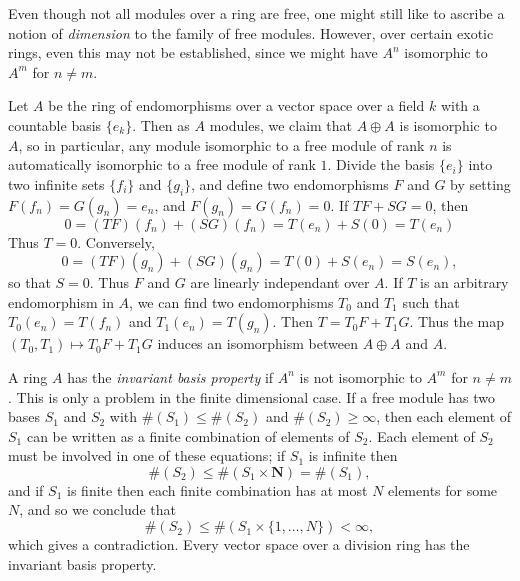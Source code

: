 Even though not all modules over a ring are free, one might still like to ascribe a notion of \emph{dimension} to the family of free modules. However, over certain exotic rings, even this may not be established, since we might have $A^n$ isomorphic to $A^m$ for $n \neq m$.

\begin{example}
    Let $A$ be the ring of endomorphisms over a vector space over a field $k$ with a countable basis $\{ e_k \}$. Then as $A$ modules, we claim that $A \oplus A$ is isomorphic to $A$, so in particular, any module isomorphic to a free module of rank $n$ is automatically isomorphic to a free module of rank $1$. Divide the basis $\{ e_i \}$ into two infinite sets $\{ f_i \}$ and $\{ g_i \}$, and define two endomorphisms $F$ and $G$ by setting $F(f_n) = G(g_n) = e_n$, and $F(g_n) = G(f_n) = 0$. If $TF + SG = 0$, then
    \[ 0 = (TF)(f_n) + (SG)(f_n) = T(e_n) + S(0) = T(e_n) \]
    Thus $T = 0$. Conversely,
    \[ 0 = (TF)(g_n) + (SG)(g_n) = T(0) + S(e_n) = S(e_n), \]
    so that $S = 0$. Thus $F$ and $G$ are linearly independant over $A$. If $T$ is an arbitrary endomorphism in $A$, we can find two endomorphisms $T_0$ and $T_1$ such that $T_0(e_n) = T(f_n)$ and $T_1(e_n) = T(g_n)$. Then $T = T_0 F + T_1 G$. Thus the map $(T_0,T_1) \mapsto T_0 F + T_1 G$ induces an isomorphism between $A \oplus A$ and $A$.
\end{example}

A ring $A$ has the \emph{invariant basis property} if $A^n$ is not isomorphic to $A^m$ for $n \neq m$. This is only a problem in the finite dimensional case. If a free module has two bases $S_1$ and $S_2$ with $\#(S_1) \leq \#(S_2)$ and $\#(S_2) \geq \infty$, then each element of $S_1$ can be written as a finite combination of elements of $S_2$. Each element of $S_2$ must be involved in one of these equations; if $S_1$ is infinite then
%
\[ \#(S_2) \leq \#(S_1 \times \mathbf{N}) = \#(S_1), \]
%
and if $S_1$ is finite then each finite combination has at most $N$ elements for some $N$, and so we conclude that
%
\[ \#(S_2) \leq \#(S_1 \times \{ 1, \dots, N \}) < \infty, \]
%
which gives a contradiction. Every vector space over a division ring has the invariant basis property.

